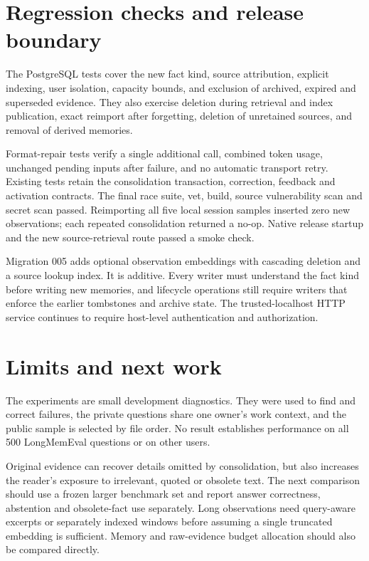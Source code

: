 \documentclass[11pt]{article}
\begin{document}
\section{Regression checks and release boundary}
The PostgreSQL tests cover the new fact kind, source attribution, explicit indexing, user isolation, capacity bounds, and exclusion of archived, expired and superseded evidence. They also exercise deletion during retrieval and index publication, exact reimport after forgetting, deletion of unretained sources, and removal of derived memories.

Format-repair tests verify a single additional call, combined token usage, unchanged pending inputs after failure, and no automatic transport retry. Existing tests retain the consolidation transaction, correction, feedback and activation contracts. The final race suite, vet, build, source vulnerability scan and secret scan passed. Reimporting all five local session samples inserted zero new observations; each repeated consolidation returned a no-op. Native release startup and the new source-retrieval route passed a smoke check.

Migration 005 adds optional observation embeddings with cascading deletion and a source lookup index. It is additive. Every writer must understand the fact kind before writing new memories, and lifecycle operations still require writers that enforce the earlier tombstones and archive state. The trusted-localhost HTTP service continues to require host-level authentication and authorization.

\section{Limits and next work}
The experiments are small development diagnostics. They were used to find and correct failures, the private questions share one owner's work context, and the public sample is selected by file order. No result establishes performance on all 500 LongMemEval questions or on other users.

Original evidence can recover details omitted by consolidation, but also increases the reader's exposure to irrelevant, quoted or obsolete text. The next comparison should use a frozen larger benchmark set and report answer correctness, abstention and obsolete-fact use separately. Long observations need query-aware excerpts or separately indexed windows before assuming a single truncated embedding is sufficient. Memory and raw-evidence budget allocation should also be compared directly.
\end{document}

